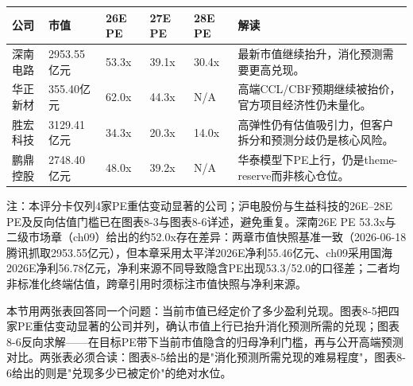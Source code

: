 \begin{exhibitbox}[图表8-5：刷新后的估值评分卡]
\small
\begin{tabularx}{\textwidth}{L{2.3cm}R{2.4cm}C{1.6cm}C{1.6cm}C{1.6cm}X}
\toprule
\textbf{公司} & \textbf{市值} & \textbf{26E PE} & \textbf{27E PE} & \textbf{28E PE} & \textbf{解读} \\
\midrule
深南电路 & 2953.55亿元 & 53.3x & 39.1x & 30.4x & 最新市值继续抬升，消化预测需要更高兑现。 \\
华正新材 & 355.40亿元 & 62.0x & 44.3x & N/A & 高端CCL/CBF预期继续被抬价，官方项目经济性仍未量化。 \\
胜宏科技 & 3129.41亿元 & 34.3x & 20.3x & 14.0x & 高弹性仍有估值吸引力，但客户拆分和预测分歧仍是核心风险。 \\
鹏鼎控股 & 2748.40亿元 & 48.0x & 39.2x & N/A & 华泰模型下PE上行，仍是theme-reserve而非核心仓位。 \\
\bottomrule
\end{tabularx}
\vspace{0.3em}
\scriptsize 注：本评分卡仅列4家PE重估变动显著的公司；沪电股份与生益科技的26E--28E PE及反向估值门槛已在图表8-3与图表8-6详述，避免重复。深南26E PE 53.3x与二级市场章（ch09）给出的约52.0x存在差异：两章市值快照基准一致（2026-06-18腾讯抓取2953.55亿元），但本章采用太平洋2026E净利55.46亿元、ch09采用国海2026E净利56.78亿元，净利来源不同导致隐含PE出现53.3/52.0的口径差；二者均非标准化终端估值，跨章引用时须标注市值快照与净利来源。
\end{exhibitbox}

本节用两张表回答同一个问题：当前市值已经定价了多少盈利兑现。图表8-5把四家PE重估变动显著的公司并列，确认市值上行已抬升消化预测所需的兑现；图表8-6反向求解——在目标PE带下当前市值隐含的归母净利门槛，再与公开高端预测对比。两张表必须合读：图表8-5给出的是"消化预测所需兑现的难易程度"，图表8-6给出的则是"兑现多少已被定价"的绝对水位。

